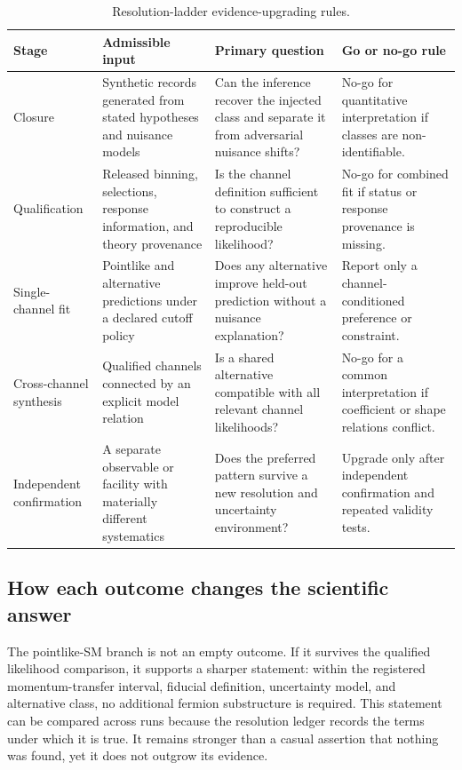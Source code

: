 \begin{table}[!t]
\caption{Resolution-ladder evidence-upgrading rules.}
\label{tab:roadmap}
\centering
\footnotesize
\begin{tabularx}{\textwidth}{p{}p{}Y Y}
\toprule
\textbf{Stage} & \textbf{Admissible input} & \textbf{Primary question} & \textbf{Go or no-go rule}\\
\midrule
Closure & Synthetic records generated from stated hypotheses and nuisance models & Can the inference recover the injected class and separate it from adversarial nuisance shifts? & No-go for quantitative interpretation if classes are non-identifiable.\\
Qualification & Released binning, selections, response information, and theory provenance & Is the channel definition sufficient to construct a reproducible likelihood? & No-go for combined fit if status or response provenance is missing.\\
Single-channel fit & Pointlike and alternative predictions under a declared cutoff policy & Does any alternative improve held-out prediction without a nuisance explanation? & Report only a channel-conditioned preference or constraint.\\
Cross-channel synthesis & Qualified channels connected by an explicit model relation & Is a shared alternative compatible with all relevant channel likelihoods? & No-go for a common interpretation if coefficient or shape relations conflict.\\
Independent confirmation & A separate observable or facility with materially different systematics & Does the preferred pattern survive a new resolution and uncertainty environment? & Upgrade only after independent confirmation and repeated validity tests.\\
\bottomrule
\end{tabularx}
\end{table}

\subsection{How each outcome changes the scientific answer}

The pointlike-SM branch is not an empty outcome. If it survives the qualified likelihood comparison, it supports a sharper statement: within the registered momentum-transfer interval, fiducial definition, uncertainty model, and alternative class, no additional fermion substructure is required. This statement can be compared across runs because the resolution ledger records the terms under which it is true. It remains stronger than a casual assertion that nothing was found, yet it does not outgrow its evidence.

